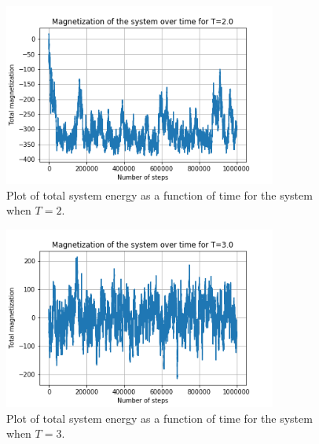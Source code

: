 \documentclass{article}
\begin{document}
\begin{figure}[H]
	\centering
	\includegraphics[width=0.8\textwidth]{../images/q2_magnetization_T=2.png}
	\caption{Plot of total system energy as a function of time for the system when $T=2$.}
	\label{fig:q2_mag_T=2}
\end{figure}

\begin{figure}[H]
	\centering
	\includegraphics[width=0.8\textwidth]{../images/q2_magnetization_T=3.png}
	\caption{Plot of total system energy as a function of time for the system when $T=3$.}
	\label{fig:q2_mag_T=3}
\end{figure}
\end{document}
